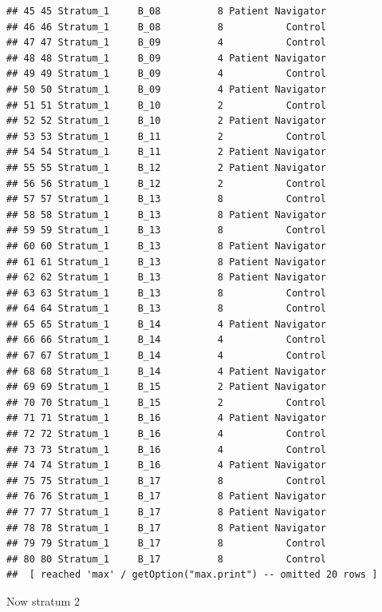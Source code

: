 \documentclass[
]{book}
\newenvironment{Shaded}{\begin{snugshade}}{\end{snugshade}}
\newcommand{\DataTypeTok}[1]{\textcolor[rgb]{0.13,0.29,0.53}{#1}}
\newcommand{\DecValTok}[1]{\textcolor[rgb]{0.00,0.00,0.81}{#1}}
\newcommand{\KeywordTok}[1]{\textcolor[rgb]{0.13,0.29,0.53}{\textbf{#1}}}
\newcommand{\NormalTok}[1]{#1}
\newcommand{\OperatorTok}[1]{\textcolor[rgb]{0.81,0.36,0.00}{\textbf{#1}}}
\newcommand{\StringTok}[1]{\textcolor[rgb]{0.31,0.60,0.02}{#1}}
\begin{document}
\begin{verbatim}
## 45 45 Stratum_1     B_08          8 Patient Navigator
## 46 46 Stratum_1     B_08          8           Control
## 47 47 Stratum_1     B_09          4           Control
## 48 48 Stratum_1     B_09          4 Patient Navigator
## 49 49 Stratum_1     B_09          4           Control
## 50 50 Stratum_1     B_09          4 Patient Navigator
## 51 51 Stratum_1     B_10          2           Control
## 52 52 Stratum_1     B_10          2 Patient Navigator
## 53 53 Stratum_1     B_11          2           Control
## 54 54 Stratum_1     B_11          2 Patient Navigator
## 55 55 Stratum_1     B_12          2 Patient Navigator
## 56 56 Stratum_1     B_12          2           Control
## 57 57 Stratum_1     B_13          8           Control
## 58 58 Stratum_1     B_13          8 Patient Navigator
## 59 59 Stratum_1     B_13          8           Control
## 60 60 Stratum_1     B_13          8 Patient Navigator
## 61 61 Stratum_1     B_13          8 Patient Navigator
## 62 62 Stratum_1     B_13          8 Patient Navigator
## 63 63 Stratum_1     B_13          8           Control
## 64 64 Stratum_1     B_13          8           Control
## 65 65 Stratum_1     B_14          4 Patient Navigator
## 66 66 Stratum_1     B_14          4           Control
## 67 67 Stratum_1     B_14          4           Control
## 68 68 Stratum_1     B_14          4 Patient Navigator
## 69 69 Stratum_1     B_15          2 Patient Navigator
## 70 70 Stratum_1     B_15          2           Control
## 71 71 Stratum_1     B_16          4 Patient Navigator
## 72 72 Stratum_1     B_16          4           Control
## 73 73 Stratum_1     B_16          4           Control
## 74 74 Stratum_1     B_16          4 Patient Navigator
## 75 75 Stratum_1     B_17          8           Control
## 76 76 Stratum_1     B_17          8 Patient Navigator
## 77 77 Stratum_1     B_17          8 Patient Navigator
## 78 78 Stratum_1     B_17          8 Patient Navigator
## 79 79 Stratum_1     B_17          8           Control
## 80 80 Stratum_1     B_17          8           Control
##  [ reached 'max' / getOption("max.print") -- omitted 20 rows ]
\end{verbatim}

Now stratum 2

\begin{Shaded}
\end{Shaded}
\end{document}
